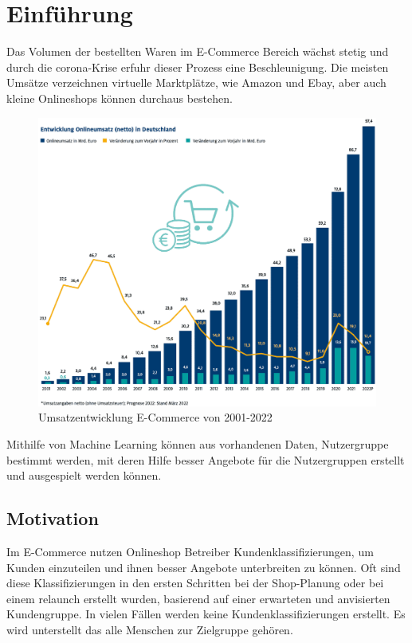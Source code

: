 \chapter{Einführung}
Das Volumen der bestellten Waren im E-Commerce Bereich wächst stetig und durch die \Gls{corona}-Krise erfuhr dieser Prozess eine Beschleunigung. Die meisten Umsätze verzeichnen virtuelle Marktplätze, wie Amazon und Ebay, aber auch kleine Onlineshops können durchaus bestehen.

\begin{figure}[!ht]
	\centering
	\includegraphics[width=\linewidth]{images/chapter1/umsatzprognose_2022.eps}
	\caption{Umsatzentwicklung E-Commerce von 2001-2022 \cite{ecommerce_statistics:versteegen2022}}
	\label{img:dependencies_between_kubernetes_helm}
\end{figure}

Mithilfe von Machine Learning können aus vorhandenen Daten, Nutzergruppe bestimmt werden, mit deren Hilfe besser Angebote für die Nutzergruppen erstellt und ausgespielt werden können.
\section{Motivation}
Im E-Commerce nutzen Onlineshop Betreiber Kundenklassifizierungen, um Kunden einzuteilen und ihnen besser Angebote unterbreiten zu können. Oft sind diese Klassifizierungen in den ersten Schritten bei der Shop-Planung oder bei einem \Gls{relaunch} erstellt wurden, basierend auf einer erwarteten und anvisierten Kundengruppe. In vielen Fällen werden keine Kundenklassifizierungen erstellt. Es wird unterstellt das alle Menschen zur Zielgruppe gehören.
